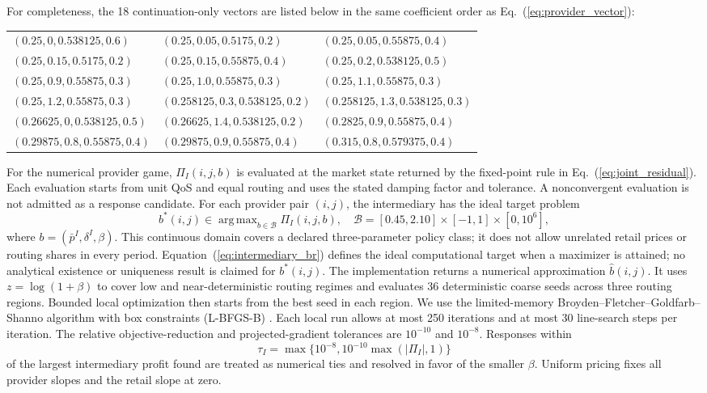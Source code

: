 \documentclass[11pt,a4paper]{article}
\DeclareMathOperator*{\argmax}{arg\,max}
\begin{document}
For completeness, the 18 continuation-only vectors are listed below in the same coefficient order as Eq.~(\ref{eq:provider_vector}):
\begin{center}
\scriptsize
\begin{tabular}{@{}lll@{}}
$(0.25,0,0.538125,0.6)$ & $(0.25,0.05,0.5175,0.2)$ & $(0.25,0.05,0.55875,0.4)$ \\
$(0.25,0.15,0.5175,0.2)$ & $(0.25,0.15,0.55875,0.4)$ & $(0.25,0.2,0.538125,0.5)$ \\
$(0.25,0.9,0.55875,0.3)$ & $(0.25,1.0,0.55875,0.3)$ & $(0.25,1.1,0.55875,0.3)$ \\
$(0.25,1.2,0.55875,0.3)$ & $(0.258125,0.3,0.538125,0.2)$ & $(0.258125,1.3,0.538125,0.3)$ \\
$(0.26625,0,0.538125,0.5)$ & $(0.26625,1.4,0.538125,0.2)$ & $(0.2825,0.9,0.55875,0.4)$ \\
$(0.29875,0.8,0.55875,0.4)$ & $(0.29875,0.9,0.55875,0.4)$ & $(0.315,0.8,0.579375,0.4)$ \\
\end{tabular}
\end{center}

For the numerical provider game, $\Pi_I(i,j,b)$ is evaluated at the market state returned by the fixed-point rule in Eq.~(\ref{eq:joint_residual}). Each evaluation starts from unit QoS and equal routing and uses the stated damping factor and tolerance. A nonconvergent evaluation is not admitted as a response candidate. For each provider pair $(i,j)$, the intermediary has the ideal target problem
\begin{equation}
b^*(i,j)\in\argmax_{b\in\mathcal B}\Pi_I(i,j,b),
\quad
\mathcal B=[0.45,2.10]\times[-1,1]\times[0,10^6],
\label{eq:intermediary_br}
\end{equation}
where $b=(\bar p^I,\delta^I,\beta)$. This continuous domain covers a declared three-parameter policy class; it does not allow unrelated retail prices or routing shares in every period. Equation~(\ref{eq:intermediary_br}) defines the ideal computational target when a maximizer is attained; no analytical existence or uniqueness result is claimed for $b^*(i,j)$. The implementation returns a numerical approximation $\widehat b(i,j)$. It uses $z=\log(1+\beta)$ to cover low and near-deterministic routing regimes and evaluates 36 deterministic coarse seeds across three routing regions. Bounded local optimization then starts from the best seed in each region. We use the limited-memory Broyden--Fletcher--Goldfarb--Shanno algorithm with box constraints (L-BFGS-B) \cite{byrd1995limited}. Each local run allows at most 250 iterations and at most 30 line-search steps per iteration. The relative objective-reduction and projected-gradient tolerances are $10^{-10}$ and $10^{-8}$. Responses within
\[
\tau_I=\max\{10^{-8},10^{-10}\max(|\Pi_I|,1)\}
\]
of the largest intermediary profit found are treated as numerical ties and resolved in favor of the smaller $\beta$. Uniform pricing fixes all provider slopes and the retail slope at zero.
\end{document}
